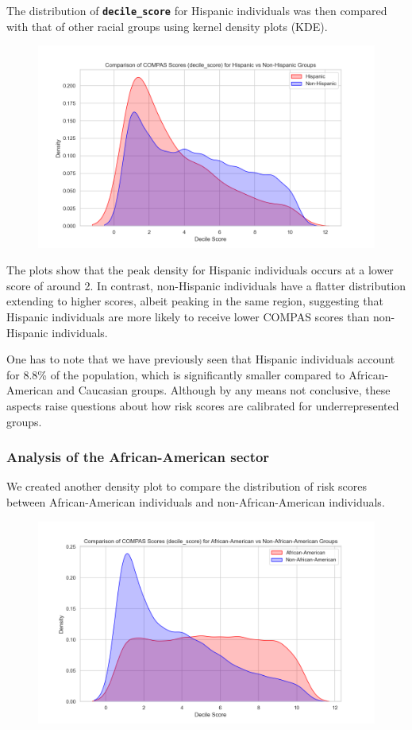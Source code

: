 \documentclass[conference]{IEEEtran}
\begin{document}
	The distribution of \textbf{\texttt{decile\_score}} for Hispanic individuals was then compared with that of other racial groups using kernel density plots (KDE). 
	
	\begin{figure}
		\centering
		\includegraphics[width=0.7\linewidth]{img/decile_score_by_race_hispanic}
		\caption{}
		\label{fig:decilescorebyracehispanic}
	\end{figure}
	
	
	The plots show that the peak density for Hispanic individuals occurs at a lower score of around 2. In contrast, non-Hispanic individuals have a flatter distribution extending to higher scores, albeit peaking in the same region, suggesting that Hispanic individuals are more likely to receive lower COMPAS scores than non-Hispanic individuals.
	
	One has to note that we have previously seen that Hispanic individuals account for 8.8\% of the population, which is significantly smaller compared to African-American and Caucasian groups.
	Although by any means not conclusive, these aspects raise questions about how risk scores are calibrated for underrepresented groups.
	
	\subsubsection{Analysis of the African-American sector}
	
	
	We created another density plot to compare the distribution of risk scores between African-American individuals and non-African-American individuals.
	
	\begin{figure}
		\centering
		\includegraphics[width=0.7\linewidth]{img/decile_score_by_race_african_american}
		\caption{}
		\label{fig:decilescorebyraceafricanamerican}
	\end{figure}
	
\end{document}
